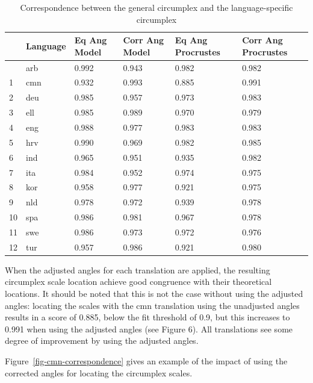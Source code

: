 \documentclass[
  authoryear,
  preprint,
  3p]{elsarticle}
\begin{document}
\begin{longtable}[]{@{}llllll@{}}

\caption{\label{tbl-correspondence}Correspondence between the general
circumplex and the language-specific circumplex}

\tabularnewline

\toprule\noalign{}
& Language & Eq Ang Model & Corr Ang Model & Eq Ang Procrustes & Corr
Ang Procrustes \\
\midrule\noalign{}
\endhead
\bottomrule\noalign{}
\endlastfoot
0 & arb & 0.992 & 0.943 & 0.982 & 0.982 \\
1 & cmn & 0.932 & 0.993 & 0.885 & 0.991 \\
2 & deu & 0.985 & 0.957 & 0.973 & 0.983 \\
3 & ell & 0.985 & 0.989 & 0.970 & 0.979 \\
4 & eng & 0.988 & 0.977 & 0.983 & 0.983 \\
5 & hrv & 0.990 & 0.969 & 0.982 & 0.985 \\
6 & ind & 0.965 & 0.951 & 0.935 & 0.982 \\
7 & ita & 0.984 & 0.952 & 0.974 & 0.975 \\
8 & kor & 0.958 & 0.977 & 0.921 & 0.975 \\
9 & nld & 0.978 & 0.972 & 0.939 & 0.978 \\
10 & spa & 0.986 & 0.981 & 0.967 & 0.978 \\
11 & swe & 0.986 & 0.973 & 0.972 & 0.976 \\
12 & tur & 0.957 & 0.986 & 0.921 & 0.980 \\

\end{longtable}

When the adjusted angles for each translation are applied, the resulting
circumplex scale location achieve good congruence with their theoretical
locations. It should be noted that this is not the case without using
the adjusted angles: locating the scales with the cmn translation using
the unadjusted angles results in a score of 0.885, below the fit
threshold of 0.9, but this increases to 0.991 when using the adjusted
angles (see Figure 6). All translations see some degree of improvement
by using the adjusted angles.

Figure~\ref{fig-cmn-correspondence} gives an example of the impact of
using the corrected angles for locating the circumplex scales.
\end{document}
